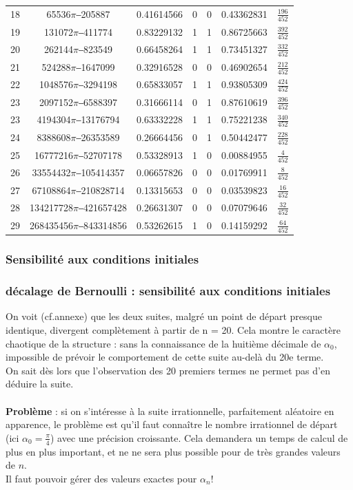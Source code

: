 \documentclass{beamer}
\begin{document}
\begin{frame}
\begin{tabular}{|*{7}{c|}}
18 & 65536$\pi$‒205887 & 0.41614566 & 0 & 0 & 0.43362831 & $\frac{196}{452}$ \\
19 & 131072$\pi$‒411774 & 0.83229132 & 1 & 1 & 0.86725663 & $\frac{392}{452}$ \\
20 & 262144$\pi$‒823549 & 0.66458264 & 1 & 1 & 0.73451327 & $\frac{332}{452}$ \\
21 & 524288$\pi$‒1647099 & 0.32916528 & 0 & 0 & 0.46902654 & $\frac{212}{452}$ \\
22 & 1048576$\pi$‒3294198 & 0.65833057 & 1 & 1 & 0.93805309 & $\frac{424}{452}$ \\
23 & 2097152$\pi$‒6588397 & 0.31666114 & 0 & 1 & 0.87610619 & $\frac{396}{452}$ \\
23 & 4194304$\pi$‒13176794 & 0.63332228 & 1 & 1 & 0.75221238 & $\frac{340}{452}$ \\
24 & 8388608$\pi$‒26353589 & 0.26664456 & 0 & 1 & 0.50442477 & $\frac{228}{452}$ \\
25 & 16777216$\pi$‒52707178 & 0.53328913 & 1 & 0 & 0.00884955 & $\frac{4}{452}$ \\
26 & 33554432$\pi$‒105414357 & 0.06657826 & 0 & 0 & 0.01769911 & $\frac{8}{452}$ \\
27 & 67108864$\pi$‒210828714 & 0.13315653 & 0 & 0 & 0.03539823 & $\frac{16}{452}$ \\
28 & 134217728$\pi$‒421657428 & 0.26631307 & 0 & 0 & 0.07079646 & $\frac{32}{452}$ \\
29 & 268435456$\pi$‒843314856 & 0.53262615 & 1 & 0 & 0.14159292 & $\frac{64}{452}$ \\
\end{tabular}
\end{frame}

\subsubsection{Sensibilité aux conditions initiales}
\begin{frame}
\frametitle{décalage de Bernoulli : sensibilité aux conditions initiales}
On voit (cf.annexe) que les deux suites, malgré un point de départ presque identique, divergent complètement à partir de n = 20. Cela montre le caractère chaotique de la structure : sans la connaissance de la huitième décimale de $\alpha_0$,  impossible de prévoir le comportement de cette suite au-delà du 20e terme.\\
On sait dès lors que l’observation des 20 premiers termes ne permet pas d’en déduire la suite.\\  
\ \\
\textbf{Problème} : si on s’intéresse à la suite irrationnelle, parfaitement aléatoire en apparence, le problème est qu’il faut connaître le nombre irrationnel de départ (ici $\alpha_0 = \frac{\pi}{4}$) avec une précision croissante. Cela demandera un temps de calcul de plus en plus important, et ne ne sera plus possible pour de très grandes valeurs de $n$. \\
Il faut pouvoir gérer des valeurs exactes pour $\alpha_n$!
\end{frame}
\end{document}

